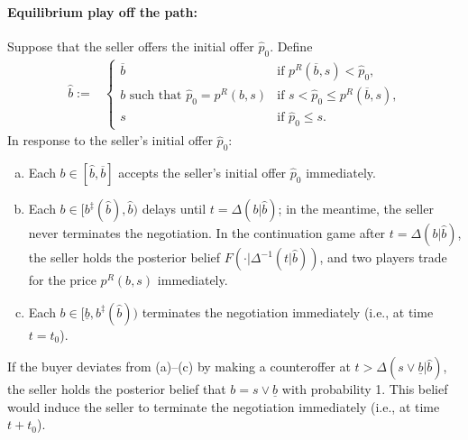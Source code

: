 \paragraph{Equilibrium play off the path:} Suppose that the seller offers the initial offer $\hat p_0$. Define 
    \begin{align*}
    \hat b :=& \left\{
    \begin{array}{cl}
    \overline b & \text{if $p^R(\overline b,s)<\hat p_0$,}
    \\
    \text{$b$ such that $\hat p_0=p^R(b,s)$} & \text{if $s<\hat p_0\leq p^R(\overline b,s)$,}
    \\
    s & \text{if $\hat p_0\leq s$. }
    \end{array}
    \right.
    \end{align*}
In response to the seller's initial offer $\hat p_0$:
    \begin{enumerate}[(a)]
	\item Each $b\in [\hat b,\overline b]$ accepts the seller's initial offer $\hat p_0$ immediately.  
	\item Each $b\in[b^\ddagger(\hat b), \hat b)$ delays until $t=\Delta (b|\hat b)$; in the meantime, the seller never terminates the negotiation.  
    In the continuation game after $t=\Delta (b|\hat b)$, the seller holds the posterior belief $F(\cdot| \Delta^{-1}(t|\hat b))$, and two players trade for the price $p^R(b,s)$ immediately.
    \item Each $b\in[\underline b, b^\ddagger(\hat b))$ terminates the negotiation immediately (i.e., at time $t=t_0$). 
\end{enumerate}


If the buyer deviates from (a)--(c) by making a counteroffer at $t>\Delta (s\vee \underline b|\hat b)$, the seller holds the posterior belief that $b=s\vee\underline b$ with probability 1. This belief would induce the seller to terminate the negotiation immediately (i.e., at time $t+t_0$). 



